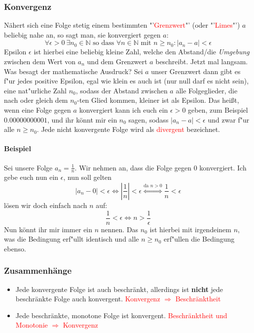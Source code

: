 \subsubsection{Konvergenz}
Nähert sich eine Folge stetig einem bestimmten "'\textcolor{red}{Grenzwert}"' (oder "'\textcolor{red}{Limes}"') $a$ beliebig nahe an, so sagt man, sie konvergiert gegen $a$:
\begin{equation*}
\forall \epsilon > 0 \ \exists n_0  \in \mathbb{N} \text{ so dass } \forall n \in \mathbb{N} \text{ mit } n \geq n_0 : |a_n - a|< \epsilon
\end{equation*}
Epsilon $\epsilon$ ist hierbei eine beliebig kleine Zahl, welche den Abstand/die \textit{Umgebung} zwischen dem Wert von $a_n$ und dem Grenzwert $a$ beschreibt. Jetzt mal langsam. Was besagt der mathematische Ausdruck? Sei $a$ unser Grenzwert dann gibt es f"ur jedes positive Epsilon, egal wie klein es auch ist (nur null darf es nicht sein), eine nat"urliche Zahl $n_0$, sodass der Abstand zwischen $a$ alle Folgeglieder, die nach oder gleich dem $n_0$-ten Glied kommen, kleiner ist als Epsilon. Das heißt, wenn eine Folge gegen $a$ konvergiert kann ich euch ein $\epsilon > 0$ geben, zum Beispiel $0.00000000001$, und ihr könnt mir ein $n_0$ sagen, sodass $|a_n - a| < \epsilon$ und zwar f"ur alle $n \geq n_0$. Jede nicht konvergente Folge wird als \textcolor{red}{divergent} bezeichnet.

\paragraph{Beispiel}
Sei unsere Folge $a_n = \frac{1}{n}$. Wir nehmen an, dass die Folge gegen $0$ konvergiert. Ich gebe euch nun ein $\epsilon$, nun soll gelten 
\begin{equation*}
|a_n - 0| < \epsilon \iff \left|\frac{1}{n}\right| < \epsilon \stackrel{\text{da } n > 0}{\iff} \frac{1}{n} < \epsilon
\end{equation*}
lösen wir doch einfach nach $n$ auf:
\begin{equation*}
\frac{1}{n} < \epsilon \iff n > \frac{1}{\epsilon}
\end{equation*}
Nun könnt ihr mir immer ein $n$ nennen. Das $n_0$ ist hierbei mit irgendeinem $n$, was die Bedingung erf"ullt identisch und alle $n \geq n_0$ erf"ullen die Bedingung ebenso.

\subsubsection{Zusammenhänge}
\begin{itemize}
\item Jede konvergente Folge ist auch beschränkt, allerdings ist \textbf{nicht} jede beschränkte Folge auch konvergent. \textcolor{red}{Konvergenz $\Rightarrow$ Beschränktheit}
\item Jede beschränkte, monotone Folge ist konvergent. \textcolor{red}{Beschränktheit und Monotonie $\Rightarrow$ Konvergenz}
\end{itemize}